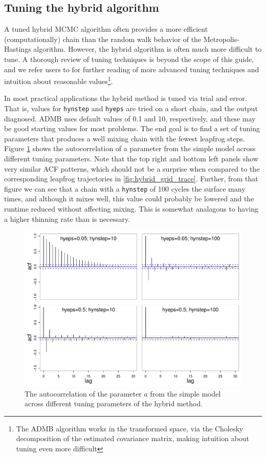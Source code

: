 \documentclass{article}\usepackage[]{graphicx}\usepackage[]{color}
\begin{document}
\subsection{Tuning the hybrid algorithm}
A tuned hybrid MCMC algorithm often provides a more
efficient (computationally) chain than the random walk
behavior of the Metropolis-Hastings algorithm. However, the
hybrid algorithm is often much more difficult to tune. A
thorough review of tuning techniques is beyond the scope of
this guide, and we refer users to \cite{brooks2011} for
further reading of more advanced tuning techniques and
intuition about reasonable values\footnote{The ADMB
  algorithm works in the transformed space, via the Cholesky
  decomposition of the estimated covariance matrix, making
  intuition about tuning even more difficult}.

In most practical applications the hybrid method is tuned
via trial and error. That is, values for \texttt{hynstep}
and \texttt{hyeps} are tried on a short chain, and the
output diagnosed. ADMB uses default values of 0.1 and 10,
respectively, and these may be good starting values for most
problems. The end goal is to find a set of tuning parameters
that produces a well mixing chain with the fewest leapfrog
steps. Figure \ref{fig:hybrid_grid_acf} shows the
autocorrelation of a parameter from the simple model across
different tuning parameters. Note that the top right and
bottom left panels show very similar ACF patterns, which
should not be a surprise when compared to the corresponding
leapfrog trajectories in
\ref{fig:hybrid_grid_trace}. Further, from that figure we
can see that a chain with a \texttt{hynstep} of 100 cycles
the surface many times, and although it mixes well, this
value could probably be lowered and the runtime reduced
without affecting mixing. This is somewhat analagous to
having a higher thinning rate than is necessary.

\begin{figure}[h]
  \centering
  \includegraphics[width=5in]{../plots/hybrid_grid_acf.pdf}
  \caption{The autocorrelation of the parameter $a$ from the simple model
    across different tuning parameters of the hybrid method.}
  \label{fig:hybrid_grid_acf}
\end{figure}
\end{document}
